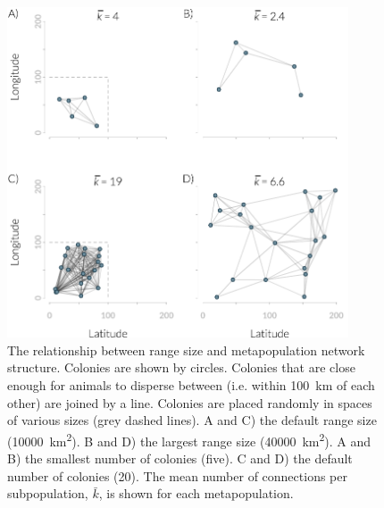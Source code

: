 \begin{knitrout}\footnotesize
{}\color{fgcolor}\begin{figure}[t]

{\centering \includegraphics[width=0.9\textwidth]{figure/colonyNetworkPlots-1} 

}

\caption[Relationship between range size and metapopulation network structure]{
The relationship between range size and metapopulation network structure.
Colonies are shown by circles.
Colonies that are close enough for animals to disperse between (i.e.  within \SI{100}{\kilo\meter} of each other) are joined by a line.
Colonies are placed randomly in spaces of various sizes (grey dashed lines).
A and C) the default range size (\SI{10000}{\square\kilo\metre}).
B and D) the largest range size (\SI{40000}{\square\kilo\metre}).
A and B) the smallest number of colonies (five).
C and D) the default number of colonies (20).
The mean number of connections per subpopulation, $\bar{k}$, is shown for each metapopulation.
}\label{fig:colonyNetworkPlots}
\end{figure}


\end{knitrout}












